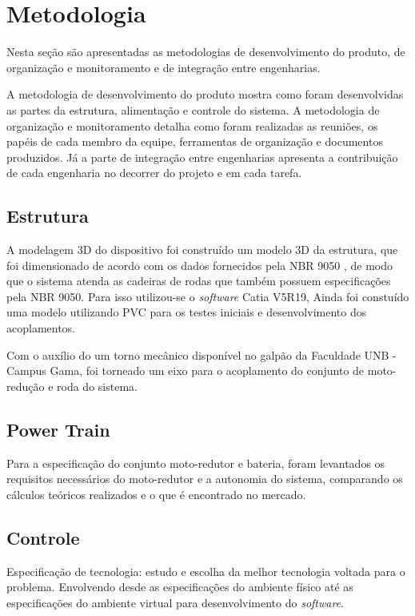 \chapter[Metodologia]{Metodologia}

Nesta seção são apresentadas as metodologias de desenvolvimento do produto, de organização e monitoramento e de integração entre engenharias.

A metodologia de desenvolvimento do produto mostra como foram desenvolvidas as partes da estrutura, alimentação e controle do sistema. A metodologia de organização e monitoramento detalha como foram realizadas as reuniões, os papéis de cada membro da equipe, ferramentas de organização e documentos produzidos. Já a parte de integração entre engenharias apresenta a contribuição de cada engenharia no decorrer do projeto e em cada tarefa.

\section{Estrutura}

A modelagem 3D do dispositivo foi construído um modelo 3D da estrutura, que foi dimensionado de acordo com os dados fornecidos pela NBR 9050 \cite{nbr9050}, de modo que o sistema atenda as cadeiras de rodas que também possuem especificações pela NBR 9050. Para isso utilizou-se o \textit{software} Catia V5R19, Ainda foi constuído uma modelo utilizando PVC para os testes iniciais e desenvolvimento dos acoplamentos.

Com o auxílio do um torno mecânico disponível no galpão da Faculdade UNB - Campus Gama, foi torneado um eixo para o acoplamento do conjunto de moto-redução e roda do sistema.

\section{Power Train}

Para a especificação do conjunto moto-redutor e bateria, foram levantados os requisitos necessários do moto-redutor e a autonomia do sistema, comparando os cálculos teóricos realizados e o que é encontrado no mercado.

\section{Controle}

	Especificação de tecnologia: estudo e escolha da melhor tecnologia voltada para o problema. Envolvendo desde as especificações do ambiente físico até as especificações do ambiente virtual para desenvolvimento do \textit{software}.

